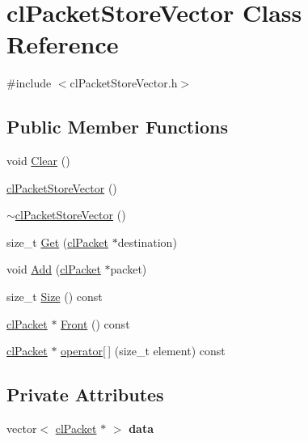 \hypertarget{classcl_packet_store_vector}{
\section{clPacketStoreVector Class Reference}
\label{classcl_packet_store_vector}
}


{\ttfamily \#include $<$clPacketStoreVector.h$>$}\subsection*{Public Member Functions}
\begin{DoxyCompactItemize}
\item 
void \hyperlink{classcl_packet_store_vector_affae13acdd3930ca0aa2609eae23dae6}{Clear} ()
\item 
\hyperlink{classcl_packet_store_vector_ae0469040a6e98410ea98ce70811fbc1e}{clPacketStoreVector} ()
\item 
\hyperlink{classcl_packet_store_vector_a1b41714f0b74042b8666dadcff99cfb1}{$\sim$clPacketStoreVector} ()
\item 
size\_\-t \hyperlink{classcl_packet_store_vector_a1166335dc4abb21918e4d3df80032ff0}{Get} (\hyperlink{classcl_packet}{clPacket} $\ast$destination)
\item 
void \hyperlink{classcl_packet_store_vector_ace15f00dffcf3a84f084b5e7c47aa228}{Add} (\hyperlink{classcl_packet}{clPacket} $\ast$packet)
\item 
size\_\-t \hyperlink{classcl_packet_store_vector_ab926455abbf6e03326a5c75238cde1c5}{Size} () const 
\item 
\hyperlink{classcl_packet}{clPacket} $\ast$ \hyperlink{classcl_packet_store_vector_a64a1bca7ea8a2c85feab5e743c3c37c2}{Front} () const 
\item 
\hyperlink{classcl_packet}{clPacket} $\ast$ \hyperlink{classcl_packet_store_vector_a67f63c94d0898cdfafffd59dff28407e}{operator\mbox{[}$\,$\mbox{]}} (size\_\-t element) const 
\end{DoxyCompactItemize}
\subsection*{Private Attributes}
\begin{DoxyCompactItemize}
\item 
\hypertarget{classcl_packet_store_vector_ac2fca784781d16366be54b5a46893c60}{
vector$<$ \hyperlink{classcl_packet}{clPacket} $\ast$ $>$ {\bfseries data}}
\label{classcl_packet_store_vector_ac2fca784781d16366be54b5a46893c60}

\end{DoxyCompactItemize}


